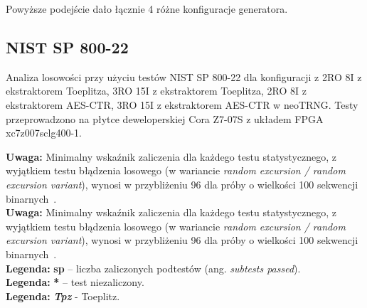 Powyższe podejście dało łącznie 4 różne konfiguracje generatora.

\subsection{NIST SP 800-22}

Analiza losowości przy użyciu testów NIST SP 800-22 dla konfiguracji z 2RO 8I z ekstraktorem 
Toeplitza, 3RO 15I z ekstraktorem Toeplitza, 2RO 8I z ekstraktorem AES-CTR, 3RO 15I z ekstraktorem 
AES-CTR w neoTRNG. Testy przeprowadzono na płytce deweloperskiej 
Cora Z7-07S z układem FPGA xc7z007sclg400-1.


\begin{flushleft}
\small \textbf{Uwaga:} Minimalny wskaźnik zaliczenia dla każdego testu statystycznego, 
z wyjątkiem testu błądzenia losowego 
(w wariancie \textit{random excursion / random excursion variant}), wynosi w 
przybliżeniu 96 dla próby o wielkości 100 sekwencji binarnych~\cite{NIST-SP-800-22}. \\
\small \textbf{Uwaga:} Minimalny wskaźnik zaliczenia dla każdego testu statystycznego, 
z wyjątkiem testu błądzenia losowego 
(w wariancie \textit{random excursion / random excursion variant}), wynosi w 
przybliżeniu 96 dla próby o wielkości 100 sekwencji binarnych~\cite{NIST-SP-800-22}. \\
\small \textbf{Legenda:} \textbf{sp} -- liczba zaliczonych podtestów (ang. \textit{subtests passed}). \\
\small \textbf{Legenda:} \textbf{*} -- test niezaliczony. \\
\small \textbf{Legenda:} \textbf{\textit{Tpz}} - Toeplitz.
\end{flushleft}

